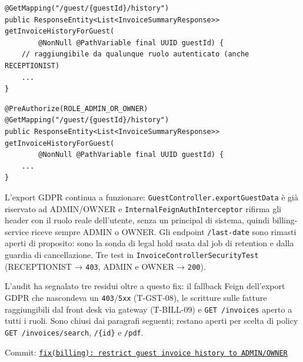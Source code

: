 ﻿\documentclass[a4paper,12pt]{report}
\newcommand{\commitref}[2]{\texttt{\small \href{https://github.com/diegoandruccioli/hotel-pms/commit/#1}{#2}}}
\begin{document}
\begin{insecurebox}[title={InvoiceController.java --- nessun controllo di ruolo (baseline)}]
\begin{lstlisting}[style=java]
@GetMapping("/guest/{guestId}/history")
public ResponseEntity<List<InvoiceSummaryResponse>> getInvoiceHistoryForGuest(
        @NonNull @PathVariable final UUID guestId) {
    // raggiungibile da qualunque ruolo autenticato (anche RECEPTIONIST)
    ...
}
\end{lstlisting}
\end{insecurebox}

\begin{securebox}[title={InvoiceController.java --- riservato ad ADMIN/OWNER (main)}]
\begin{lstlisting}[style=java]
@PreAuthorize(ROLE_ADMIN_OR_OWNER)
@GetMapping("/guest/{guestId}/history")
public ResponseEntity<List<InvoiceSummaryResponse>> getInvoiceHistoryForGuest(
        @NonNull @PathVariable final UUID guestId) {
    ...
}
\end{lstlisting}
\end{securebox}

L'export GDPR continua a funzionare: \texttt{GuestController.exportGuestData}
è già riservato ad ADMIN/OWNER e \texttt{InternalFeignAuthInterceptor} rifirma
gli header con il ruolo reale dell'utente, senza un principal di sistema,
quindi billing-service riceve sempre ADMIN o OWNER. Gli endpoint
\texttt{/last-date} sono rimasti aperti di proposito: sono la sonda di
legal hold usata dal job di retention e dalla guardia di cancellazione.
Tre test in \texttt{InvoiceControllerSecurityTest} (RECEPTIONIST →
\texttt{403}, ADMIN e OWNER → \texttt{200}).

\begin{notebox}[title={Residui emersi dall'audit}]
L'audit ha segnalato tre residui oltre a questo fix: il fallback Feign
dell'export GDPR che nascondeva un \texttt{403}/\texttt{5xx}
(T-GST-08), le scritture sulle fatture raggiungibili dal front desk via
gateway (T-BILL-09) e \texttt{GET /invoices} aperto a tutti i ruoli. Sono
chiusi dai paragrafi seguenti; restano aperti per scelta di policy
\texttt{GET /invoices/search}, \texttt{/\{id\}} e \texttt{/pdf}.
\end{notebox}

Commit: \commitref{c6899b9}{fix(billing): restrict guest invoice history to ADMIN/OWNER}
\end{document}
